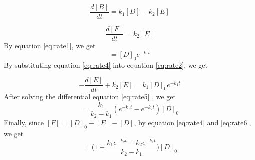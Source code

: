 \begin{equation}
\frac{d[B]}{dt} = k_1 [D] - k_2 [E]
\label{eq:rate2}
\end{equation}

\begin{equation}
\frac{d[F]}{dt} = k_2 [E]
\label{eq:rate3}
\end{equation}
By equation \ref{eq:rate1}, we get
\begin{equation}
[D] = [D]_0 e^{-k_1 t}
\label{eq:rate4}
\end{equation}
By substituting equation \ref{eq:rate4} into equation \ref{eq:rate2}, we get

\begin{equation}
- \frac{d[E]}{dt} + k_2 [E] = k_1 [D]_0 e^{-k_1 t}
\label{eq:rate5}
\end{equation}
After solving the differential equation \ref{eq:rate5} , we get
\begin{equation}
[E] = \frac{k_1}{k_2 - k_1} (e^{-k_1 t} - e^{-k_2 t}) [D]_0
\label{eq:rate6}
\end{equation}
Finally, since $[F]=[D]_0 -[E]-[D]$, by equation \ref{eq:rate4} and \ref{eq:rate6}, we get
\begin{equation}
[F] = \Bigg( 1+ \frac{k_1 e^{-k_2 t} - k_2 e^{-k_1 t}}{k_2 - k_1} \Bigg) [D]_0
\label{eq:rate7}
\end{equation}

